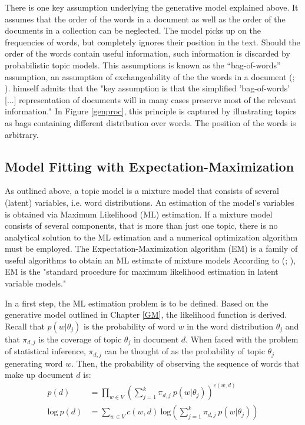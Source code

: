\documentclass[11pt,a4paper,english,oneside]{book}
\numberwithin{equation}{chapter}
\begin{document}
There is one key assumption underlying the generative model explained above. It assumes that the order of the words in a document as well as the order of the documents in a collection can be neglected. The model picks up on the frequencies of words, but completely ignores their position in the text. Should the order of the words contain useful information, such information is discarded by probabilistic topic models. This assumptions is known as the “bag-of-words” assumption, an assumption of exchangeability of the the words in a document (\citealt[p.~994]{Blei.2003}; \citealt[~p. 3]{Steyvers(2007)}). \citet[~p. 290]{Hofmann.1999} himself admits that the "key assumption is that the simplified 'bag-of-words' [...] representation of documents will in many cases preserve most of the relevant information." In Figure \ref{genproc}, this principle is captured by illustrating topics as bags containing different distribution over words. The position of the words is arbitrary.
 
\subsection{Model Fitting with Expectation-Maximization}

As outlined above, a topic model is a mixture model that consists of several (latent) variables, i.e. word distributions. An estimation of the model's variables is obtained via Maximum Likelihood (ML) estimation. If a mixture model consists of several components, that is more than just one topic, there is no analytical solution to the ML estimation and a numerical optimization algorithm must be employed. The Expectation-Maximization algorithm (EM) is a family of useful algorithms to obtain an ML estimate of mixture models \cite[~p. 359]{Zhai.2016} According to \citeauthor{Hofmann.1999} (\citeyear[p. 290]{Hofmann.1999}; \citeyear[p. 181]{Hofmann.2001}), EM is the "standard procedure for maximum likelihood estimation in latent variable models." 

In a first step, the ML estimation problem is to be defined. Based on the generative model outlined in Chapter \ref{GM}, the likelihood function is derived. Recall that $p(w | \theta_j)$ is the probability of word $w$ in the word distribution $\theta_j$ and that $\pi_{d,j}$ is the coverage of topic $\theta_j$ in document $d$. When faced with the problem of statistical inference, $\pi_{d,j}$ can be thought of as the probability of topic $\theta_j$ generating word $w$. Then, the probability of observing the sequence of words that make up document $d$ is:
\begin{align}
\label{prob} p(d) &= \underset{w \in V}\prod \left( \sum_{j=1}^{k}\pi_{d,j} \ p(w|\theta_j) \right)^{c(w,d)}\\
\label{log} \text{log} \ p(d) &= \underset{w \in V}\sum c(w,d) \ \text{log} \left( \sum_{j=1}^{k}\pi_{d,j} \ p(w|\theta_j) \right)
\end{align}
\end{document}
